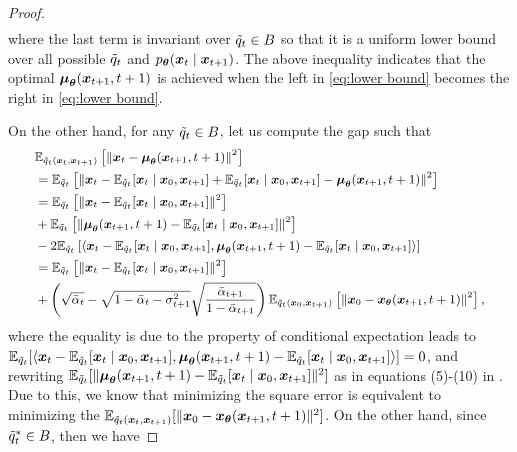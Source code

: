 \begin{proof}
\begin{equation}
\begin{aligned}
		\end{aligned}
	\end{equation}
	where the last term is invariant over $\tilde{q}_{t}\in B$ so that it is a uniform lower bound over all possible $\tilde{q}_{t}$ and $p_{\boldsymbol{\theta}}(\boldsymbol{x}_{t} \mid \boldsymbol{x}_{t + 1})$. The above inequality indicates that the optimal $\text{\boldmath{$\mu$}}_{\boldsymbol{\theta}}(\boldsymbol{x}_{t + 1}, t + 1)$ is achieved when the left in \eqref{eq:lower bound} becomes the right in \eqref{eq:lower bound}.
	\par
	On the other hand, for any $\tilde{q}_{t}\in B$, let us compute the gap such that
	\begin{equation}
		\small
		\begin{aligned}
			& \mathbb{E}_{\tilde{q}_{t}(\boldsymbol{x}_{t}, \boldsymbol{x}_{t + 1})} \left[\left\|\boldsymbol{x}_{t} - \text{\boldmath{$\mu$}}_{\boldsymbol{\theta}}(\boldsymbol{x}_{t + 1}, t + 1)\right\|^{2}\right] \\
            &= 
            \mathbb{E}_{\tilde{q}_{t}}\left[\left\|\boldsymbol{x}_{t} - \mathbb{E}_{\tilde{q}_{t}}[\boldsymbol{x}_{t}\mid \boldsymbol{x}_{0}, \boldsymbol{x}_{t + 1}] + \mathbb{E}_{\tilde{q}_{t}}[\boldsymbol{x}_{t}\mid \boldsymbol{x}_{0}, \boldsymbol{x}_{t + 1}] - \text{\boldmath{$\mu$}}_{\boldsymbol{\theta}}(\boldsymbol{x}_{t + 1}, t + 1)\right\|^{2}\right] \\
            & = 
            \mathbb{E}_{\tilde{q}_{t}}\left[\left\|\boldsymbol{x}_{t} - \mathbb{E}_{\tilde{q}_{t}}[\boldsymbol{x}_{t}\mid \boldsymbol{x}_{0}, \boldsymbol{x}_{t + 1}]\right\|^{2}\right]\\
			& + \mathbb{E}_{\tilde{q}_{t}}\left[\left\|\text{\boldmath{$\mu$}}_{\boldsymbol{\theta}}(\boldsymbol{x}_{t + 1}, t + 1) - \mathbb{E}_{\tilde{q}_{t}}[\boldsymbol{x}_{t}\mid \boldsymbol{x}_{0}, \boldsymbol{x}_{t + 1}]\right\|^{2}\right] \\
			& - 2\mathbb{E}_{\tilde{q}_{t}}\left[\left\langle\boldsymbol{x}_{t} - \mathbb{E}_{\tilde{q}_{t}}[\boldsymbol{x}_{t}\mid \boldsymbol{x}_{0}, \boldsymbol{x}_{t + 1}], \text{\boldmath{$\mu$}}_{\boldsymbol{\theta}}(\boldsymbol{x}_{t + 1}, t + 1) - \mathbb{E}_{\tilde{q}_{t}}[\boldsymbol{x}_{t}\mid \boldsymbol{x}_{0}, \boldsymbol{x}_{t + 1}]\right\rangle\right] \\
			& = \mathbb{E}_{\tilde{q}_{t}}\left[\left\|\boldsymbol{x}_{t} - \mathbb{E}_{\tilde{q}_{t}}[\boldsymbol{x}_{t}\mid \boldsymbol{x}_{0}, \boldsymbol{x}_{t + 1}]\right\|^{2}\right]\\
			& + \left(\sqrt{\bar{\alpha}_{t}} - \sqrt{1 - \bar{\alpha}_{t} - \sigma_{t + 1}^{2}}\sqrt{\frac{\bar{\alpha}_{t + 1}}{1 - \bar{\alpha}_{t +1}}}\right)\mathbb{E}_{\tilde{q}_{t}(\boldsymbol{x}_{0}, \boldsymbol{x}_{t + 1})}\left[\left\|\boldsymbol{x}_{0} - \boldsymbol{x}_{\boldsymbol{\theta}}(\boldsymbol{x}_{t + 1}, t + 1)\right\|^{2}\right],
		\end{aligned}
	\end{equation}
	where the equality is due to the property of conditional expectation leads to $\mathbb{E}_{\tilde{q}_{t}}[\langle\boldsymbol{x}_{t} - \mathbb{E}_{\tilde{q}_{t}}[\boldsymbol{x}_{t}\mid \boldsymbol{x}_{0}, \boldsymbol{x}_{t + 1}], \text{\boldmath{$\mu$}}_{\boldsymbol{\theta}}(\boldsymbol{x}_{t + 1}, t + 1) - \mathbb{E}_{\tilde{q}_{t}}[\boldsymbol{x}_{t}\mid \boldsymbol{x}_{0}, \boldsymbol{x}_{t + 1}]\rangle]=0$, and rewriting $\mathbb{E}_{\tilde{q}_{t}}[\|\text{\boldmath{$\mu$}}_{\boldsymbol{\theta}}(\boldsymbol{x}_{t + 1}, t + 1) - \mathbb{E}_{\tilde{q}_{t}}[\boldsymbol{x}_{t}\mid \boldsymbol{x}_{0}, \boldsymbol{x}_{t + 1}]\|^{2}]$ as in equations (5)-(10) in \citep{ho2020denoising}. Due to this, we know that minimizing the square error is equivalent to minimizing the $\mathbb{E}_{\tilde{q}_{t}(\boldsymbol{x}_{t}, \boldsymbol{x}_{t + 1})}[\|\boldsymbol{x}_{0} - \boldsymbol{x}_{\boldsymbol{\theta}}(\boldsymbol{x}_{t + 1}, t + 1)\|^{2}]$. On the other hand, since $\tilde{q}_{t}^{*}\in B$, then we have 

\end{proof}
